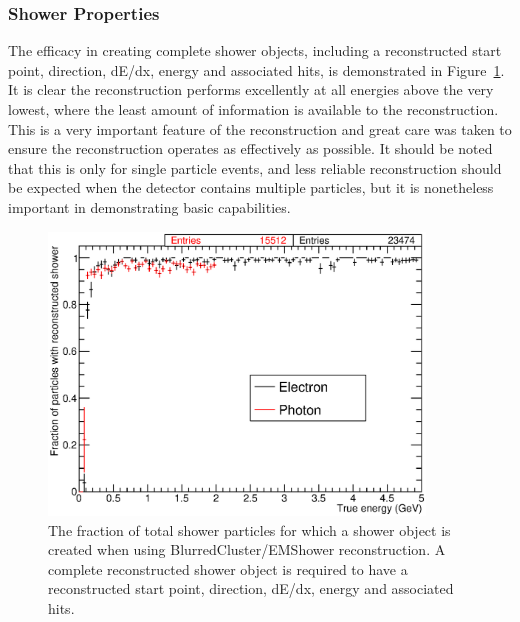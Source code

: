 \subsubsection{Shower Properties}\label{sec:ShowerProperties}

The efficacy in creating complete shower objects, including a reconstructed start point, direction, dE/dx, energy and associated hits, is demonstrated in Figure~\ref{fig:ShowerReconstructedEnergy}.  It is clear the reconstruction performs excellently at all energies above the very lowest, where the least amount of information is available to the reconstruction.  This is a very important feature of the reconstruction and great care was taken to ensure the reconstruction operates as effectively as possible.  It should be noted that this is only for single particle events, and less reliable reconstruction should be expected when the detector contains multiple particles, but it is nonetheless important in demonstrating basic capabilities.

\begin{figure}
  \centering
  \includegraphics[width=10cm]{ShowerReconstructedEnergy.eps}
  \caption[The fraction of total shower particles for which a shower object is created when using BlurredCluster/EMShower reconstruction.]{The fraction of total shower particles for which a shower object is created when using BlurredCluster/EMShower reconstruction.  A complete reconstructed shower object is required to have a reconstructed start point, direction, dE/dx, energy and associated hits.}
  \label{fig:ShowerReconstructedEnergy}
\end{figure}


